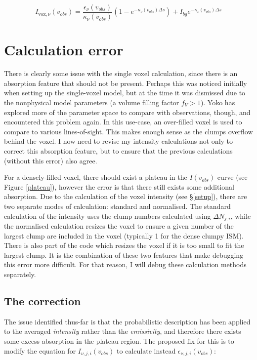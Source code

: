 \documentclass[a4paper]{article}
\begin{document}
    \[
    I_{\mathrm{vox},\nu} (v_{obs}) = \frac{\epsilon_\nu (v_{obs})}{\kappa_\nu (v_{obs})} \left( 1 - e^{-\kappa_\nu (v_{obs}) \Delta s} \right) + I_{bg} e^{-\kappa_\nu (v_{obs}) \Delta s}
    \]

    \section{Calculation error}

    There is clearly some issue with the single voxel calculation, since there is an absorption feature that should not be present.
    Perhaps this was noticed initially when setting up the single-voxel model, but at the time it was dismissed due to the nonphysical model parameters (a volume filling factor \(f_V > 1\)).
    Yoko has explored more of the parameter space to compare with observations, though, and encountered this problem again.
    In this use-case, an over-filled voxel is used to compare to various lines-of-sight.
    This makes enough sense as the clumps overflow behind the voxel.
    I now need to revise my intensity calculations not only to correct this absorption feature, but to ensure that the previous calculations (without this error) also agree.

    For a densely-filled voxel, there should exist a plateau in the \(I(v_{obs})\) curve (see Figure \ref{plateau}), however the error is that there still exists some additional absorption.
    Due to the calculation of the voxel intensity (see \S \ref{setup}), there are two separate modes of calculation: standard and normalised.
    The standard calculation of the intensity uses the clump numbers calculated using \(\Delta N_{j,i}\), while the normalised calculation resizes the voxel to ensure a given number of the largest clump are included in the voxel (typically 1 for the dense clumpy ISM).
    There is also part of the code which resizes the voxel if it is too small to fit the largest clump.
    It is the combination of these two features that make debugging this error more difficult.
    For that reason, I will debug these calculation methods separately.

    \subsection{The correction}

    The issue identified thus-far is that the probabilistic description has been applied to the averaged \textit{intensity} rather than the \textit{emissivity}, and therefore there exists some excess absorption in the plateau region.
    The proposed fix for this is to modify the equation for \(I_{\nu, j, i} (v_{obs})\) to calculate instead \(\epsilon_{\nu, j, i} (v_{obs})\):
\end{document}
